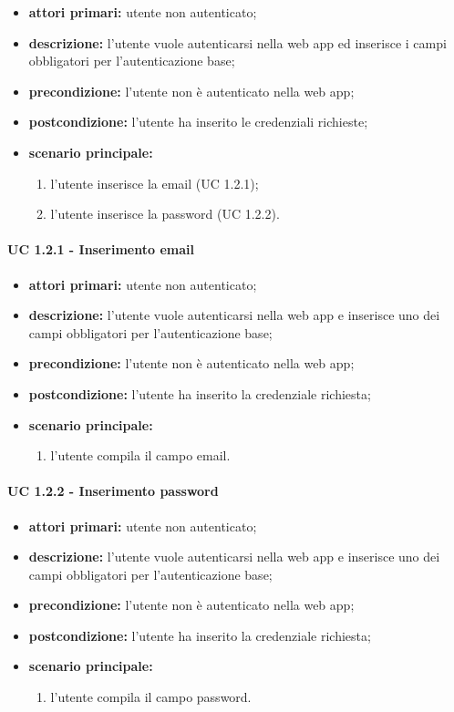 		\begin{itemize}
			\item \textbf{attori primari:} utente non autenticato;
			\item \textbf{descrizione:} l'utente vuole autenticarsi nella web app ed inserisce i campi obbligatori per l'autenticazione base;
			\item \textbf{precondizione:} l'utente non è autenticato nella web app;
			\item \textbf{postcondizione:} l'utente ha inserito le credenziali richieste;
			\item \textbf{scenario principale:}
			\begin{enumerate}
				\item l'utente inserisce la email (UC 1.2.1);
				\item l'utente inserisce la password (UC 1.2.2).
			\end{enumerate}
		\end{itemize}

			\paragraph{UC 1.2.1 - Inserimento email}
			\begin{itemize}
				\item \textbf{attori primari:} utente non autenticato;
				\item \textbf{descrizione:} l'utente vuole autenticarsi nella web app e inserisce uno dei campi obbligatori per l'autenticazione base;
				\item \textbf{precondizione:} l'utente non è autenticato nella web app;
				\item \textbf{postcondizione:} l'utente ha inserito la credenziale richiesta;
				\item \textbf{scenario principale:}
				\begin{enumerate}
					\item l'utente compila il campo email.
				\end{enumerate}
			\end{itemize}

			\paragraph{UC 1.2.2 - Inserimento password}
			\begin{itemize}
				\item \textbf{attori primari:} utente non autenticato;
				\item \textbf{descrizione:} l'utente vuole autenticarsi nella web app e inserisce uno dei campi obbligatori per l'autenticazione base;
				\item \textbf{precondizione:} l'utente non è autenticato nella web app;
				\item \textbf{postcondizione:} l'utente ha inserito la credenziale richiesta;
				\item \textbf{scenario principale:}
				\begin{enumerate}
					\item l'utente compila il campo password.
				\end{enumerate}
			\end{itemize}

